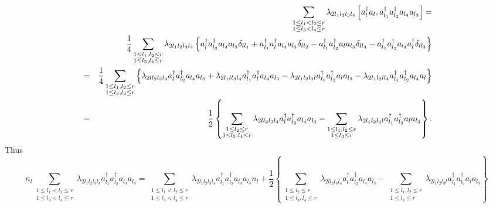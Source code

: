 \documentclass[12pt]{article}
\begin{document}
\begin{eqnarray}
&&\sum_{\substack{ 1\leq l_{1}<l_{2}\leq r \\ 1\leq l_{3}<l_{4}\leq r}}%
\lambda _{2l_{1}l_{2}l_{3}l_{4}}\left[ a_{l}^{\dagger
}a_{l},a_{l_{1}}^{\dagger }a_{l_{2}}^{\dagger }a_{l_{4}}a_{l_{3}}\right] = 
\notag \\
&&\frac{1}{4}\sum_{\substack{ 1\leq l_{1},l_{2}\leq r \\ 1\leq
l_{3},l_{4}\leq r}}\lambda _{2l_{1}l_{2}l_{3}l_{4}}\left\{ a_{l}^{\dagger
}a_{l_{2}}^{\dagger }a_{l_{4}}a_{l_{3}}\delta _{ll_{1}}+a_{l_{1}}^{\dagger
}a_{l}^{\dagger }a_{l_{4}}a_{l_{3}}\delta _{ll_{2}}-a_{l_{1}}^{\dagger
}a_{l_{2}}^{\dagger }a_{l}a_{l_{3}}\delta _{ll_{4}}-a_{l_{1}}^{\dagger
}a_{l_{2}}^{\dagger }a_{l_{4}}a_{l}^{\dagger }\delta _{ll_{3}}\right\}  
\notag \\
&=&\frac{1}{4}\sum_{\substack{ 1\leq l_{1},l_{2}\leq r \\ 1\leq
l_{3},l_{4}\leq r}}\left\{ \lambda _{2ll_{2}l_{3}l_{4}}a_{l}^{\dagger
}a_{l_{2}}^{\dagger }a_{l_{4}}a_{l_{3}}+\lambda
_{2l_{1}ll_{3}l_{4}}a_{l_{1}}^{\dagger }a_{l}^{\dagger
}a_{l_{4}}a_{l_{3}}-\lambda _{2l_{1}l_{2}l_{3}l}a_{l_{1}}^{\dagger
}a_{l_{2}}^{\dagger }a_{l}a_{l_{3}}-\lambda
_{2l_{1}l_{2}ll_{4}}a_{l_{1}}^{\dagger }a_{l_{2}}^{\dagger
}a_{l_{4}}a_{l}\right\}   \notag \\
&=&\frac{1}{2}\left\{ \sum_{\substack{ 1\leq l_{2}\leq r \\ 1\leq
l_{3},l_{4}\leq r}}\lambda _{2ll_{2}l_{3}l_{4}}a_{l}^{\dagger
}a_{l_{2}}^{\dagger }a_{l_{4}}a_{l_{3}}-\sum_{\substack{ 1\leq
l_{1},l_{2}\leq r \\ 1\leq l_{3}\leq r}}\lambda
_{2l_{1}l_{2}l_{3}l}a_{l_{1}}^{\dagger }a_{l_{2}}^{\dagger
}a_{l}a_{l_{3}}\right\} .
\end{eqnarray}%
Thus 
\begin{equation}
n_{l}\sum_{\substack{ 1\leq l_{1}<l_{2}\leq r \\ 1\leq l_{3}<l_{4}\leq r}}%
\lambda _{2l_{1}l_{2}l_{3}l_{4}}a_{l_{1}}^{\dagger }a_{l_{2}}^{\dagger
}a_{l_{4}}a_{l_{3}}=\sum_{\substack{ 1\leq l_{1}<l_{2}\leq r \\ 1\leq
l_{3}<l_{4}\leq r}}\lambda _{2l_{1}l_{2}l_{3}l_{4}}a_{l_{1}}^{\dagger
}a_{l_{2}}^{\dagger }a_{l_{4}}a_{l_{3}}n_{l}+\frac{1}{2}\left\{ \sum
_{\substack{ 1\leq l_{2}\leq r \\ 1\leq l_{3},l_{4}\leq r}}\lambda
_{2ll_{2}l_{3}l_{4}}a_{l}^{\dagger }a_{l_{2}}^{\dagger
}a_{l_{4}}a_{l_{3}}-\sum_{\substack{ 1\leq l_{1},l_{2}\leq r \\ 1\leq
l_{3}\leq r}}\lambda _{2l_{1}l_{2}l_{3}l}a_{l_{1}}^{\dagger
}a_{l_{2}}^{\dagger }a_{l}a_{l_{3}}\right\} 
\end{equation}%
\end{document}
